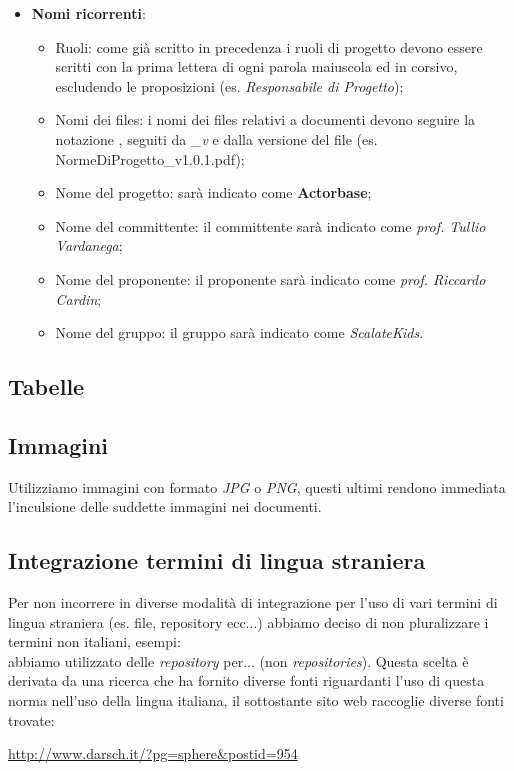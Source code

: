 \documentclass{scalatekids-article}
\begin{document}
\begin{itemize}
\item \textbf{Nomi ricorrenti}:
  \begin{itemize}
  \item Ruoli: come già scritto in precedenza i ruoli di progetto devono essere scritti con la prima lettera di ogni parola maiuscola ed in corsivo, escludendo le proposizioni (es. \textit{Responsabile di Progetto});
  \item Nomi dei files: i nomi dei files relativi a documenti devono seguire
    la notazione \textit{}, seguiti da \textit{\_v} e dalla
    versione del file (es. NormeDiProgetto\_v1.0.1.pdf);
  \item Nome del progetto: sarà indicato come \textbf{Actorbase};
  \item Nome del committente: il committente sarà indicato come \textit{prof. Tullio Vardanega};
  \item Nome del proponente: il proponente sarà indicato come \textit{prof. Riccardo Cardin};
  \item Nome del gruppo: il gruppo sarà indicato come \textit{ScalateKids}.
  \end{itemize}
\end{itemize}

\subsection{Tabelle}

\subsection{Immagini}
Utilizziamo immagini con formato \textit{JPG} o \textit{PNG}, questi ultimi rendono immediata l'inculsione delle suddette immagini nei documenti.

\subsection{Integrazione termini di lingua straniera}
Per non incorrere in diverse modalità di integrazione per l'uso di vari termini di lingua straniera (es. file, repository ecc...) abbiamo deciso di non pluralizzare i termini non italiani, esempi:\\
abbiamo utilizzato delle \textit{repository} per... (non \textit{repositories}).
Questa scelta è derivata da una ricerca che ha fornito diverse fonti riguardanti l'uso di questa norma nell'uso della lingua italiana, il sottostante sito web raccoglie diverse fonti trovate:\\
\begin{center}
  \url{http://www.darsch.it/?pg=sphere&postid=954}
\end{center}
\end{document}
